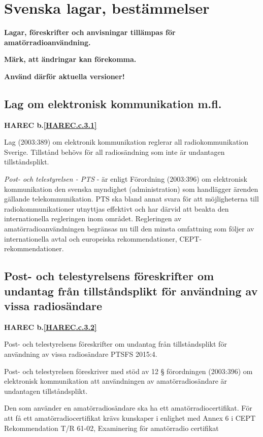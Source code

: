 \section{Svenska lagar, bestämmelser}

\textbf{Lagar, föreskrifter och anvisningar tillämpas för
  amatörradioanvändning.}

\textbf{Märk, att ändringar kan förekomma.}

\textbf{Använd därför aktuella versioner!}


\subsection{Lag om elektronisk kommunikation m.fl.}
\textbf{
HAREC b.\ref{HAREC.c.3.1}\label{myHAREC.c.3.1}
}

Lag (2003:389) om elektronik kommunikation reglerar all radiokommunikation Sverige. Tillstånd behövs för all radiosändning som inte är undantagen
tillståndsplikt.

\emph{Post- och telestyrelsen - PTS} - är enligt Förordning (2003:396) om
elektronisk kommunikation den svenska myndighet (administration) som handlägger
ärenden gällande telekommunikation. PTS ska bland annat svara för att
möjligheterna till radiokommunikationer utnyttjas effektivt och har därvid att
beakta den internationella regleringen inom området. Regleringen av
amatörradioanvändningen begränsas nu till den minsta omfattning som
följer av internationella avtal och europeiska rekommendationer,
CEPT-rekommendationer.

\subsection{Post- och telestyrelsens föreskrifter om undantag från tillståndsplikt för användning av vissa radiosändare}
\textbf{
HAREC b.\ref{HAREC.c.3.2}\label{myHAREC.c.3.2}
}

Post- och telestyrelsens föreskrifter om undantag från tillståndsplikt för
användning av vissa radiosändare PTSFS 2015:4.

Post- och telestyrelsen föreskriver med stöd av 12 § förordningen (2003:396)
om elektronisk kommunikation att användningen av amatörradiosändare är
undantagen tillståndsplikt.

Den som använder en amatörradiosändare ska ha ett amatörradiocertifikat. För
att få ett amatörradiocertifikat krävs kunskaper i enlighet med Annex 6 i 
CEPT Rekommendation T/R 61-02, Examinering för amatörradio certifikat

